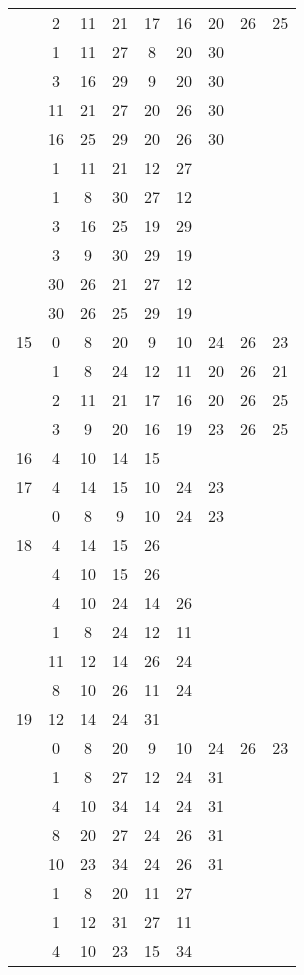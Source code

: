 \begin{table}[H]
\begin{tabular}{|c|cccccccc|}
 & 2 & 11 & 21 & 17 & 16 & 20 & 26 & 25\\
 & 1 & 11 & 27 & 8 & 20 & 30 &   &  \\
 & 3 & 16 & 29 & 9 & 20 & 30 &   &  \\
 & 11 & 21 & 27 & 20 & 26 & 30 &   &  \\
 & 16 & 25 & 29 & 20 & 26 & 30 &   &  \\
 & 1 & 11 & 21 & 12 & 27 &   &   &  \\
 & 1 & 8 & 30 & 27 & 12 &   &   &  \\
 & 3 & 16 & 25 & 19 & 29 &   &   &  \\
 & 3 & 9 & 30 & 29 & 19 &   &   &  \\
 & 30 & 26 & 21 & 27 & 12 &   &   &  \\
 & 30 & 26 & 25 & 29 & 19 &   &   &  \\
\hline
15  & 0 & 8 & 20 & 9 & 10 & 24 & 26 & 23\\
 & 1 & 8 & 24 & 12 & 11 & 20 & 26 & 21\\
 & 2 & 11 & 21 & 17 & 16 & 20 & 26 & 25\\
 & 3 & 9 & 20 & 16 & 19 & 23 & 26 & 25\\
\hline
16  & 4 & 10 & 14 & 15 &   &   &   &  \\
\hline
17  & 4 & 14 & 15 & 10 & 24 & 23 &   &  \\
 & 0 & 8 & 9 & 10 & 24 & 23 &   &  \\
\hline
18  & 4 & 14 & 15 & 26 &   &   &   &  \\
 & 4 & 10 & 15 & 26 &   &   &   &  \\
 & 4 & 10 & 24 & 14 & 26 &   &   &  \\
 & 1 & 8 & 24 & 12 & 11 &   &   &  \\
 & 11 & 12 & 14 & 26 & 24 &   &   &  \\
 & 8 & 10 & 26 & 11 & 24 &   &   &  \\
\hline
19  & 12 & 14 & 24 & 31 &   &   &   &  \\
 & 0 & 8 & 20 & 9 & 10 & 24 & 26 & 23\\
 & 1 & 8 & 27 & 12 & 24 & 31 &   &  \\
 & 4 & 10 & 34 & 14 & 24 & 31 &   &  \\
 & 8 & 20 & 27 & 24 & 26 & 31 &   &  \\
 & 10 & 23 & 34 & 24 & 26 & 31 &   &  \\
 & 1 & 8 & 20 & 11 & 27 &   &   &  \\
 & 1 & 12 & 31 & 27 & 11 &   &   &  \\
 & 4 & 10 & 23 & 15 & 34 &   &   &  \\

\end{tabular}
\end{table}

